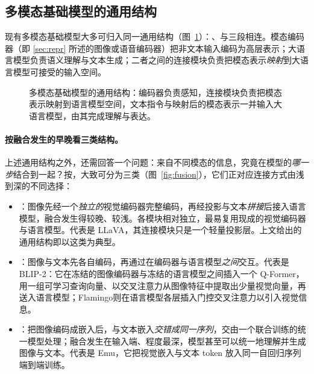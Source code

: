 \subsection{多模态基础模型的通用结构}
\label{sub:arch}

现有多模态基础模型大多可归入同一通用结构（图~\ref{fig:pipeline}）：、与三段相连。模态编码器（即 \ref{sec:repr} 所述的图像或语音编码器）把非文本输入编码为高层表示；大语言模型负责语义理解与文本生成；二者之间的连接模块负责把模态表示\emph{映射}到大语言模型可接受的输入空间。

\begin{figure}[htbp]
  \centering
  \caption{多模态基础模型的通用结构：编码器负责感知，连接模块负责把模态表示映射到语言模型空间，文本指令与映射后的模态表示一并输入大语言模型，由其完成理解与表达。}
  \label{fig:pipeline}
\end{figure}

\paragraph{按融合发生的早晚看三类结构。}上述通用结构之外，还需回答一个问题：来自不同模态的信息，究竟在模型的\emph{哪一步}结合到一起？按，大致可分为三类（图~\ref{fig:fusion}），它们正对应连接方式由浅到深的不同选择：

\begin{itemize}
  \item {}：图像先经一个\emph{独立的}视觉编码器完整编码，再经投影与文本\emph{拼接}后接入语言模型，融合发生得较晚、较浅。各模块相对独立，最易复用现成的视觉编码器与语言模型。代表是 LLaVA\cite{llava}，其连接模块只是一个轻量投影层。上文给出的通用结构即以这类为典型。
  \item {}：图像与文本先各自编码，再通过在编码器与语言模型\emph{之间}交互。代表是 BLIP-2\cite{blip2}：它在冻结的图像编码器与冻结的语言模型之间插入一个 Q-Former，用一组可学习查询向量、以交叉注意力从图像特征中提取出少量视觉向量，再送入语言模型；Flamingo\cite{flamingo}则在语言模型各层插入门控交叉注意力以引入视觉信息。
  \item {}：把图像编码成嵌入后，与文本嵌入\emph{交错成同一序列}，交由一个联合训练的统一模型处理；融合发生在输入端、程度最深，模型甚至可以统一地理解并生成图像与文本。代表是 Emu\cite{emu}，它把视觉嵌入与文本 token 放入同一自回归序列端到端训练。
\end{itemize}

